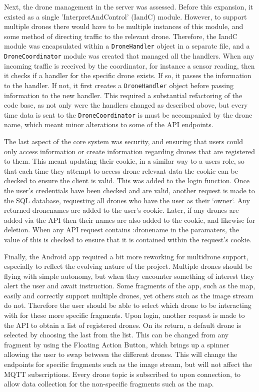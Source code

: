 \documentclass{article}
\begin{document}
Next, the drone management in the server was assessed. Before this expansion, it existed as a single 'InterpretAndControl' (IandC) module. However, to support multiple drones there would have to be multiple instances of this module, and some method of directing traffic to the relevant drone. Therefore, the IandC module was encapsulated within a \texttt{DroneHandler} object in a separate file, and a \texttt{DroneCoordinator} module was created that managed all the handlers. When any incoming traffic is received by the coordinator, for instance a sensor reading, then it checks if a handler for the specific drone exists. If so, it passes the information to the handler. If not, it first creates a \texttt{DroneHandler} object before passing information to the new handler. This required a substantial refactoring of the code base, as not only were the handlers changed as described above, but every time data is sent to the \texttt{DroneCoordinator} is must be accompanied by the drone name, which meant minor alterations to some of the API endpoints.

The last aspect of the core system was security, and ensuring that users could only access information or create information regarding drones that are registered to them. This meant updating their cookie, in a similar way to a users role, so that each time they attempt to access drone relevant data the cookie can be checked to ensure the client is valid. This was added to the login function. Once the user's credentials have been checked and are valid, another request is made to the SQL database, requesting all drones who have the user as their `owner`. Any returned dronenames are added to the user's cookie. Later, if any drones are added via the API then their names are also added to the cookie, and likewise for deletion. When any API request contains :dronename in the paramaters, the value of this is checked to ensure that it is contained within the request's cookie. 

Finally, the Android app required a bit more reworking for multidrone support, especially to reflect the evolving nature of the project. Multiple drones should be flying with simple autonomy, but when they encounter something of interest they alert the user and await instruction. Some fragments of the app, such as the map, easily and correctly support multiple drones, yet others such as the image stream do not. Therefore the user should be able to select which drone to be interacting with for these more specific fragments. Upon login, another request is made to the API to obtain a list of registered drones. On its return, a default drone is selected by choosing the last from the list. This can be changed from any fragment by using the Floating Action Button, which brings up a spinner allowing the user to swap between the different drones. This will change the endpoints for specific fragments such as the image stream, but will not affect the MQTT subscriptions. Every drone topic is subscribed to upon connection, to allow data collection for the non-specific fragments such as the map. 
\end{document}
